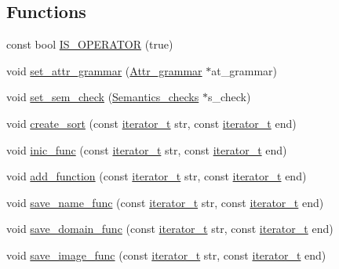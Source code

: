 \subsection*{Functions}
\begin{CompactItemize}
\item 
const bool \hyperlink{namespacegenevalmag_29dbe8034050c247526ecae47ff95529}{IS\_\-OPERATOR} (true)
\item 
void \hyperlink{namespacegenevalmag_e77bed22019c46ef3b6d11c18c87a85f}{set\_\-attr\_\-grammar} (\hyperlink{classgenevalmag_1_1Attr__grammar}{Attr\_\-grammar} $\ast$at\_\-grammar)
\item 
void \hyperlink{namespacegenevalmag_b68c3ea3b4064fbd96451dd2a094ad34}{set\_\-sem\_\-check} (\hyperlink{classgenevalmag_1_1Semantics__checks}{Semantics\_\-checks} $\ast$s\_\-check)
\item 
void \hyperlink{namespacegenevalmag_8fe47e97e9f000f1eb35ee9e86b2a5c0}{create\_\-sort} (const \hyperlink{namespacegenevalmag_64946721fb97e58be670a468bf8e7056}{iterator\_\-t} str, const \hyperlink{namespacegenevalmag_64946721fb97e58be670a468bf8e7056}{iterator\_\-t} end)
\item 
void \hyperlink{namespacegenevalmag_815257dc75d0f8a85662cdfc618c2187}{inic\_\-func} (const \hyperlink{namespacegenevalmag_64946721fb97e58be670a468bf8e7056}{iterator\_\-t} str, const \hyperlink{namespacegenevalmag_64946721fb97e58be670a468bf8e7056}{iterator\_\-t} end)
\item 
void \hyperlink{namespacegenevalmag_ff5e0f0cff477c34b63116d99dfbe9b0}{add\_\-function} (const \hyperlink{namespacegenevalmag_64946721fb97e58be670a468bf8e7056}{iterator\_\-t} str, const \hyperlink{namespacegenevalmag_64946721fb97e58be670a468bf8e7056}{iterator\_\-t} end)
\item 
void \hyperlink{namespacegenevalmag_f3954dcbe7a20818880776138409f413}{save\_\-name\_\-func} (const \hyperlink{namespacegenevalmag_64946721fb97e58be670a468bf8e7056}{iterator\_\-t} str, const \hyperlink{namespacegenevalmag_64946721fb97e58be670a468bf8e7056}{iterator\_\-t} end)
\item 
void \hyperlink{namespacegenevalmag_e333368e344fd2e4542788afb8d9990e}{save\_\-domain\_\-func} (const \hyperlink{namespacegenevalmag_64946721fb97e58be670a468bf8e7056}{iterator\_\-t} str, const \hyperlink{namespacegenevalmag_64946721fb97e58be670a468bf8e7056}{iterator\_\-t} end)
\item 
void \hyperlink{namespacegenevalmag_6c5fe5628b5ac4b3e2d9c4fc93985abe}{save\_\-image\_\-func} (const \hyperlink{namespacegenevalmag_64946721fb97e58be670a468bf8e7056}{iterator\_\-t} str, const \hyperlink{namespacegenevalmag_64946721fb97e58be670a468bf8e7056}{iterator\_\-t} end)

\end{CompactItemize}
